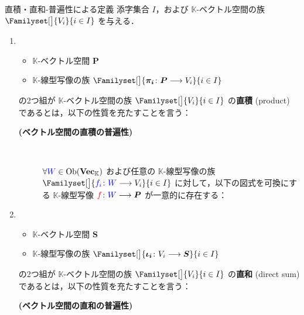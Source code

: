 \documentclass[rep_main]{subfiles}
\begin{document}
\begin{mydef}[label=def:univ-vec-sum,breakable]{直積・直和-普遍性による定義}
	添字集合 $I$，および $\mathbb{K}$-ベクトル空間の族 $\Familyset[\big]{V_i}{i\in I}$ を与える．
	\begin{enumerate}
		\item \begin{itemize}
            \item $\mathbb{K}$-ベクトル空間 $\bm{P}$
            \item $\mathbb{K}$-線型写像の族 $\Familyset[\big]{ \bm{\pi_i} \colon \bm{P} \lto V_i}{i \in I}$
        \end{itemize}
        の2つ組が $\mathbb{K}$-ベクトル空間の族 $\Familyset[\big]{V_i}{i \in I}$ の\textbf{直積} (product) であるとは，以下の性質を充たすことを言う：
        \begin{description}
            \item[\textbf{(ベクトル空間の直積の普遍性)}]　
            
            $\forall \textcolor{blue}{W} \in \mathrm{Ob}(\bm{\mathrm{Vec}_{\mathbb{K}}})$ および任意の $\mathbb{K}$-線型写像の族 $\Familyset[\big]{\textcolor{blue}{f_i} \colon \textcolor{blue}{W} \lto V_i}{i \in I}$ に対して，以下の図式を可換にする $\mathbb{K}$-線型写像 $\textcolor{red}{f} \colon \textcolor{blue}{W} \longrightarrow \bm{P}$ が一意的に存在する：
            \begin{center}
            \end{center}
        \end{description}
        
		\item \begin{itemize}
            \item $\mathbb{K}$-ベクトル空間 $\bm{S}$
            \item $\mathbb{K}$-線型写像の族 $\Familyset[\big]{\bm{\iota_i} \colon V_i \lto \bm{S}}{i \in I}$
        \end{itemize}
        の2つ組が $\mathbb{K}$-ベクトル空間の族 $\Familyset[\big]{V_i}{i \in I}$ の\textbf{直和} (direct sum) であるとは，以下の性質を充たすことを言う：
        \begin{description}
            \item[\textbf{(ベクトル空間の直和の普遍性)}]　
            

\end{description}
\end{enumerate}
\end{mydef}
\end{document}
